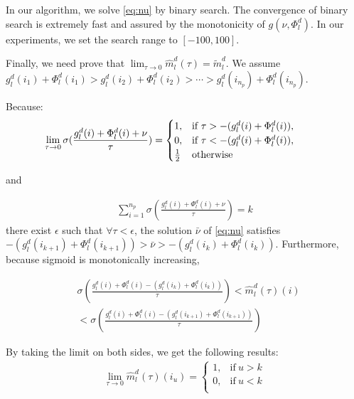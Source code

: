 \documentclass[11pt]{article}
\begin{document}
In our algorithm, we solve \eqref{eq:nu} by binary search. The convergence of binary search is extremely fast and assured by the monotonicity of $g(\nu,\Phi_l^d)$. In our experiments, we set the search range to $[-100,100]$.

Finally, we need prove that $\lim_{\tau \rightarrow 0}\hat{m}_l^d(\tau) = \tilde{m}_l^d$. We assume $g_l^d(i_1) + \Phi_l^d(i_1) > g_l^d(i_2) + \Phi_l^d(i_2) > \cdots > g_l^d(i_{n_p}) + \Phi_l^d(i_{n_p})$.

Because:
\begin{align*}
\hspace{-3.em}
\lim_{\tau \rightarrow 0} \sigma(\frac{g_l^d(i) + \Phi_l^d(i) + \nu}{\tau}) = \begin{cases}
      1, & \text{if}\ \tau > - (g_l^d(i) + \Phi_l^d(i)), \\
      0, & \text{if}\ \tau < - (g_l^d(i) + \Phi_l^d(i)), \\
      \frac{1}{2} &\text{otherwise}\\
    \end{cases}
\end{align*}

and 

\begin{align*}
\displaystyle{\mathop{\sum}_{i=1}^{n_p}} \sigma(\frac{g_l^d(i) + \Phi_l^d(i) + \nu}{\tau}) = k
\end{align*}
there exist $\epsilon$ such that $\forall \tau < \epsilon$, the solution $\bar{\nu}$ of \eqref{eq:nu} satisfies $- (g_l^d(i_{k+1}) + \Phi_l^d(i_{k+1})) > \bar{\nu} > - (g_l^d(i_k) + \Phi_l^d(i_k))$. Furthermore, because sigmoid is monotonically increasing,

\begin{align*}
&\sigma(\frac{g_l^d(i) + \Phi_l^d(i) - (g_l^d(i_{k}) + \Phi_l^d(i_{k}))}{\tau}) < \hat{m}_l^d(\tau)(i)  \\
& < \sigma(\frac{g_l^d(i) + \Phi_l^d(i) - (g_l^d(i_{k+1}) + \Phi_l^d(i_{k+1}))}{\tau}) 
\end{align*}

By taking the limit on both sides, we get the following results:
\begin{align*}
\lim_{\tau \rightarrow 0} \hat{m}_l^d(\tau)(i_u) = \begin{cases}
      1, & \text{if}\ u > k \\
      0, & \text{if}\ u < k \\
    \end{cases}
\end{align*}
\end{document}
